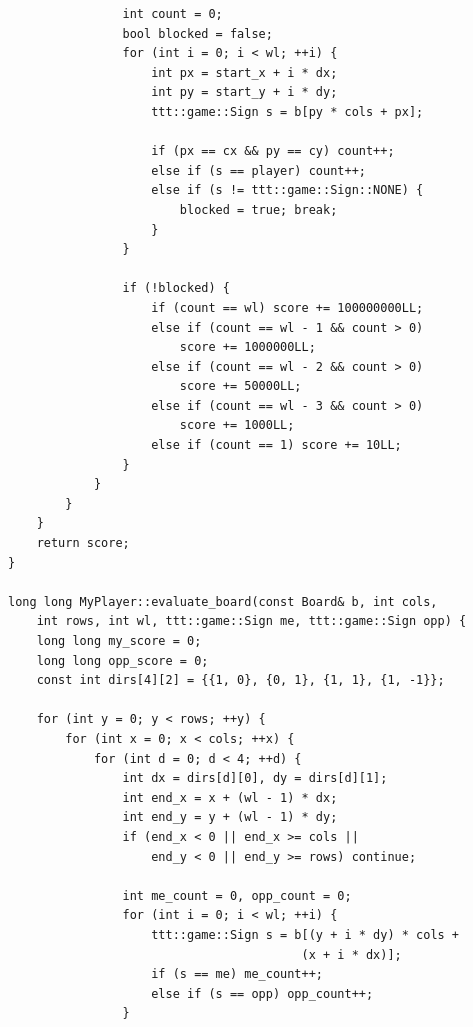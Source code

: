 \documentclass[a4paper,14pt]{extreport}
\begin{document}
\begin{lstlisting}
                int count = 0;
                bool blocked = false;
                for (int i = 0; i < wl; ++i) {
                    int px = start_x + i * dx;
                    int py = start_y + i * dy;
                    ttt::game::Sign s = b[py * cols + px];
                    
                    if (px == cx && py == cy) count++; 
                    else if (s == player) count++;
                    else if (s != ttt::game::Sign::NONE) { 
                        blocked = true; break; 
                    }
                }
                
                if (!blocked) {
                    if (count == wl) score += 100000000LL;
                    else if (count == wl - 1 && count > 0) 
                        score += 1000000LL;
                    else if (count == wl - 2 && count > 0) 
                        score += 50000LL;
                    else if (count == wl - 3 && count > 0) 
                        score += 1000LL;
                    else if (count == 1) score += 10LL;
                }
            }
        }
    }
    return score;
}

long long MyPlayer::evaluate_board(const Board& b, int cols, 
    int rows, int wl, ttt::game::Sign me, ttt::game::Sign opp) {
    long long my_score = 0;
    long long opp_score = 0;
    const int dirs[4][2] = {{1, 0}, {0, 1}, {1, 1}, {1, -1}};

    for (int y = 0; y < rows; ++y) {
        for (int x = 0; x < cols; ++x) {
            for (int d = 0; d < 4; ++d) {
                int dx = dirs[d][0], dy = dirs[d][1];
                int end_x = x + (wl - 1) * dx;
                int end_y = y + (wl - 1) * dy;
                if (end_x < 0 || end_x >= cols || 
                    end_y < 0 || end_y >= rows) continue;

                int me_count = 0, opp_count = 0;
                for (int i = 0; i < wl; ++i) {
                    ttt::game::Sign s = b[(y + i * dy) * cols + 
                                         (x + i * dx)];
                    if (s == me) me_count++;
                    else if (s == opp) opp_count++;
                }


\end{lstlisting}
\end{document}
